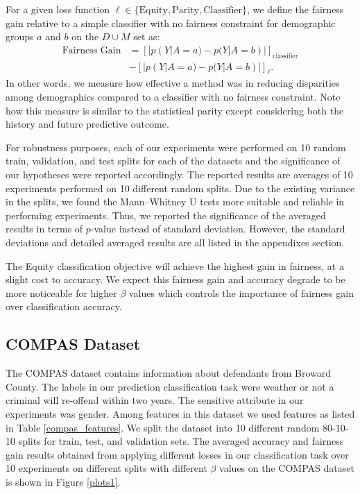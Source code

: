 \begin{mybox}
\begin{definition} 
For a given loss function $\ell \in \{\text{Equity},\text{Parity},\text{Classifier}\}$, we define the fairness gain relative to a simple classifier with no fairness constraint for demographic groups $a$ and $b$ on the $D \cup M$ set as:
\begin{align*}
 \text{Fairness Gain}&=\left[|p(Y|A=a)-p(Y|A=b)|\right]_\text{classifier}\\
 & -\left[|p(Y|A=a)-p(Y|A=b)|\right]_\ell.
\end{align*}
In other words, we measure how effective a method was in reducing disparities among demographics compared to a classifier with no fairness constraint. Note how this measure is similar to the statistical parity except considering both the history and future predictive outcome.
\end{definition}
\end{mybox}
For robustness purposes, each of our experiments were performed on 10 random train, validation, and test splits for each of the datasets and the significance of our hypotheses were reported accordingly. The reported results are averages of 10 experiments performed on 10 different random splits. Due to the existing variance in the splits, we found the Mann–Whitney U tests more suitable and reliable in performing experiments. Thus, we reported the significance of the averaged results in terms of $p$-value instead of standard deviation. However, the standard deviations and detailed averaged results are all listed in the appendixes section.  
\begin{tcolorbox}
\begin{hyp} 
The Equity classification objective will achieve the highest gain in fairness, at a slight cost to accuracy. We expect this fairness gain and accuracy degrade to be more noticeable for higher $\beta$ values which controls the importance of fairness gain over classification accuracy.
\end{hyp}
\end{tcolorbox}
\subsection{COMPAS Dataset}
The COMPAS dataset contains information about defendants from Broward County. The labels in our prediction classification task were weather or not a criminal will re-offend within two years. The sensitive attribute in our experiments was gender. Among features in this dataset we used features as listed in Table \ref{compas_features}. We split the dataset into 10 different random 80-10-10 splits for train, test, and validation sets. The averaged accuracy and fairness gain results obtained from applying different losses in our classification task over 10 experiments on different splits with different $\beta$ values on the COMPAS dataset is shown in Figure \ref{plots1}.

